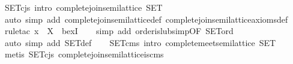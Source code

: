 \begin{isabellebody}
\isanewline
{}\isamarkupfalse%
\ SET{}cjs\ {}intro{}{}\ {}complete{}join{}semilattice\ SET{}\isanewline
%
\isadelimproof
\ \ %
\endisadelimproof
%
\isatagproof
{}\isamarkupfalse%
\ {}auto\ simp\ add{}\ complete{}join{}semilattice{}def\ complete{}join{}semilattice{}axioms{}def{}\isanewline
\ \ \isamarkupfalse%
\ {}rule{}tac\ x\ {}\ {}{}X{}\ \ bexI{}\isanewline
\ \ \isamarkupfalse%
\ {}simp\ add{}\ order{}is{}lub{}simp{}OF\ SET{}ord{}{}\isanewline
\ \ \isamarkupfalse%
\ {}auto\ simp\ add{}\ SET{}def{}\isanewline
\ \ \isamarkupfalse%
%
\endisatagproof
{\isafoldproof}%
%
\isadelimproof
\isanewline
%
\endisadelimproof
\isanewline
{}\isamarkupfalse%
\ SET{}cms\ {}intro{}{}\ {}complete{}meet{}semilattice\ SET{}\isanewline
%
\isadelimproof
\ \ %
\endisadelimproof
%
\isatagproof
{}\isamarkupfalse%
\ {}metis\ SET{}cjs\ complete{}join{}semilattice{}is{}cms{}%

\end{isabellebody}
